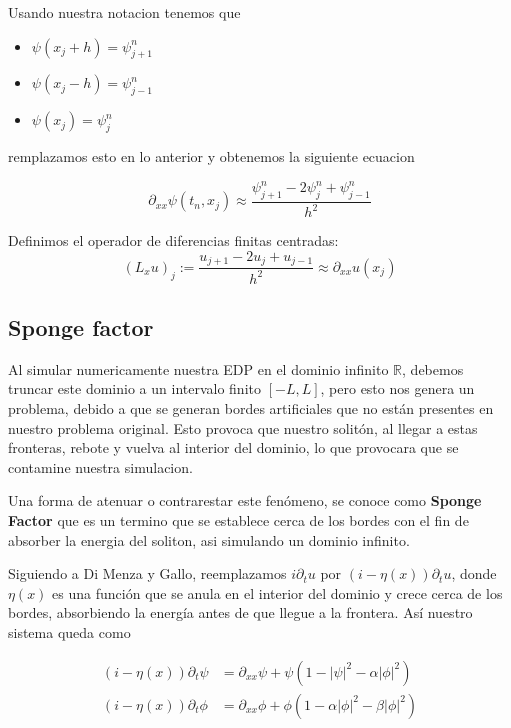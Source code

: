 \documentclass[letterpaper,11pt]{exam}
\newcommand{\R}{\mathbb R}
\theoremstyle{plain}
\begin{document}
Usando nuestra notacion tenemos que 

\begin{itemize}
    \item $\psi(x_j+h)=\psi_{j+1}^n$
    \item $\psi(x_j-h)=\psi_{j-1}^n$
    \item $\psi(x_j)=\psi_j^n$
\end{itemize}

remplazamos esto en lo anterior y obtenemos la siguiente ecuacion

\begin{equation*}
    \partial_{xx}\psi(t_n,x_j)\approx\frac{\psi_{j+1}^n-2\psi_j^n+\psi_{j-1}^n}{h^2}
\end{equation*}



Definimos el operador de diferencias finitas centradas:
\begin{equation*}
    (L_xu)_j:= \frac{u_{j+1}-2u_j+u_{j-1}}{h^2}\approx \partial_{xx}u(x_j)
\end{equation*}


\subsection{Sponge factor}
Al simular numericamente nuestra EDP en el dominio infinito $\R$, debemos truncar este dominio a un intervalo finito $[-L,L]$, pero esto nos genera un problema, debido a que se generan bordes artificiales que no están presentes en nuestro problema original. Esto provoca que nuestro solitón, al llegar a estas fronteras, rebote y vuelva al interior del dominio, lo que provocara que se contamine nuestra simulacion.


\hspace{2mm}

Una forma de atenuar o contrarestar este fenómeno, se conoce como \textbf{Sponge Factor} que es un termino que se establece cerca de los bordes con el fin de absorber la energia del soliton, asi simulando un dominio infinito.

\hspace{2mm}

Siguiendo a Di Menza y Gallo, reemplazamos $i\partial_t u$ por $(i-\eta(x))\partial_t u$, donde $\eta(x)$ es una función que se anula en el interior del dominio y crece cerca de los bordes, absorbiendo la energía 
antes de que llegue a la frontera. Así nuestro sistema queda como

\begin{align}
    (i-\eta(x) )\partial_t \psi&=\partial_{xx}\psi + \psi (1-|\psi|^2-\alpha|\phi|^2)  \\
         (i-\eta(x) ) \partial_t \phi&=\partial_{xx}\phi + \phi(1-\alpha|\phi|^2-\beta|\phi|^2) 
\end{align}
\end{document}
